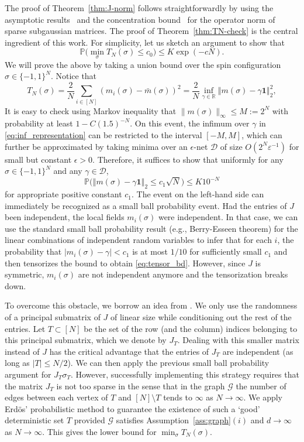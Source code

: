 \documentclass[letterpaper,11pt,reqno]{amsart}
\renewcommand{\le}{\leqslant}
\newcommand{\eps}{\varepsilon}
\newcommand{\norm}[1]{\left\Vert#1\right\Vert}
\newcommand{\cG}{\mathcal{G}}\newcommand{\cH}{\mathcal{H}}\newcommand{\cI}{\mathcal{I}}
\newcommand{\mv}[1]{\boldsymbol{#1}}\newcommand{\mvinfty}{\boldsymbol{\infty}}\newcommand{\mvzero}{\boldsymbol{0}}
\newcommand{\mvm}{{m}}
\newcommand{\mvgs}{{\sigma}}
\newcommand{\bP}{\mathbb{P}}\newcommand{\bQ}{\mathbb{Q}}\newcommand{\bR}{\mathbb{R}}
\begin{document}
The proof of Theorem~\ref{thm:J-norm} follows straightforwardly by using the asymptotic results~\cite{BvH16} and the concentration bound~\cite{CDG23} for the operator norm of sparse subgaussian matrices. The proof of Theorem~\ref{thm:TN-check} is the central ingredient of this work.
For simplicity, let us sketch an argument to show that 
\[
\bP\bigl(\min_{\mvgs} T_N(\mvgs) \le c_0\bigr)\le K  \exp (-cN).
\]
We will prove the above by taking a union bound over the spin configuration $\mvgs \in \{-1, 1\}^N$. Notice that 
\begin{equation}\label{eq:inf_representation}
 T_N(\mvgs) = \frac2N \sum_{i\in[N]} (m_i(\mvgs) - \bar{\mvm}(\mvgs))^2 = \frac2N  \inf_{\gamma \in \bR} \norm{\mvm(\mvgs) - \gamma  \mv1}_2^2,
\end{equation}
It is easy to check using Markov inequality that $\|\mvm(\mvgs) \|_\infty \le M:=2^N$ with probability at least $1 - C(1.5)^{-N}$. On this event, 
the infimum over $\gamma$ in \eqref{eq:inf_representation} can be restricted to the interval $[-M, M]$, which can further be approximated by taking minima over an $\epsilon$-net $\mathcal{D}$ of size $O(2^N\eps^{-1})$ for small but constant $\epsilon > 0$. Therefore, it suffices to show that 
uniformly for any $\mvgs \in \{-1, 1\}^N$ and any $\gamma \in \mathcal{D}$, 
\begin{equation}\label{eq:tensor_bd}
\bP\bigl(\norm{\mvm(\mvgs) - \gamma \mv1}_2 \le c_1 \sqrt{N} \bigr) \le K 10^{-N}
\end{equation}
for appropriate positive constant $c_1$.
The event on the left-hand side can immediately be recognized as a small ball probability event. Had the entries of $J$ been independent, the local fields $m_i(\mvgs)$ were independent. In that case, we can use the standard small ball probability result (e.g., Berry-Esseen theorem) for the linear combinations of independent random variables to infer that for each $i$, the probability that $|m_i(\mvgs) - \gamma| < c_1$ is at most $1/10$ for sufficiently small $c_1$ and then tensorizes the bound to obtain \eqref{eq:tensor_bd}. However, since $J$ is symmetric, $m_i(\mvgs)$ are not independent anymore and the tensorization breaks down. 

To overcome this obstacle, we borrow an idea from \cite{Ver14}. We only use the randomness of a principal submatrix of $J$  of linear size while conditioning out the rest of the entries. Let $T \subset [N]$ be the set of the row (and the column) indices belonging to this principal submatrix, which we denote by $J_T$.  Dealing with this smaller matrix instead of $J$ has the critical advantage that the entries of $J_T$  are independent (as long as $|T| \le N/2$). We can then apply the previous small ball probability argument for $J_T \sigma_T$. However, successfully implementing this strategy requires that the matrix $J_T$ is not too sparse in the sense that in the graph $\cG$ the number of edges between each vertex of $T$ and $[N]\setminus T$ tends to $\infty$ as $N \to \infty$.  We apply Erd\"os' probabilistic method to guarantee the existence of such a `good' deterministic set $T$ provided $\cG$ satisfies Assumption~\ref{ass:graph}$(i)$ and $d\to\infty$ as $N\to\infty$. This gives the lower bound for $\min_{\mvgs} T_N(\mvgs)$.
\end{document}

